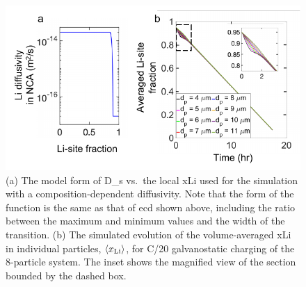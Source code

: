 \documentclass{WileyMSP-template}
\begin{document}
\newpage
\begin{figure}[!h]
  \includegraphics[scale =1]{figures/modeling_figure_2.pdf}
  \caption{(a) The model form of \gls{D_s} vs.\ the local
    \gls{xLi} used for the simulation with a
    composition-dependent diffusivity. Note that the form of the
    function is the same as that of \gls{ecd} shown above, including
    the ratio between the maximum and minimum values and the width of
    the transition. (b) The simulated evolution of the volume-averaged
    \gls{xLi} in individual particles, $\langle x_{\rm{Li}} \rangle$,
    for C/20 galvanostatic charging of the 8-particle system. The
    inset shows the magnified view of the section bounded by the
    dashed box.}
  \label{fig:model-2}
\end{figure}
\end{document}
